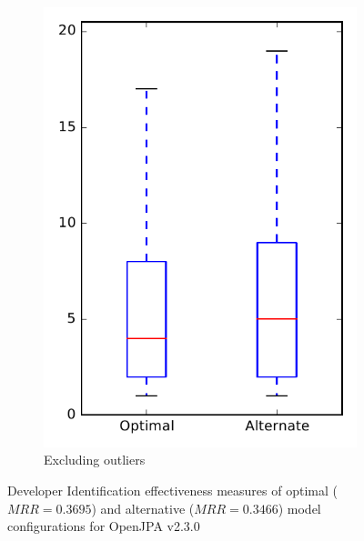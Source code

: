 \begin{figure}
\begin{subfigure}{.4\textwidth}
        \includegraphics[height=0.4\textheight]{figures/combo/dit_rq1_openjpa_no_outlier}
        \caption{Excluding outliers}\label{fig:combo:dit:rq1:openjpa_no_outlier}
    \end{subfigure}
\caption{Developer Identification effectiveness measures of optimal ($MRR=0.3695$) and alternative ($MRR=0.3466$) model configurations for OpenJPA v2.3.0}
\label{fig:combo:dit:rq1:openjpa}
\end{figure}
